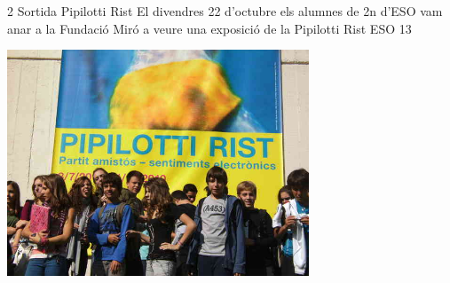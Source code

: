 %
%
\begin{news}
{2} %
{Sortida Pipilotti Rist}
{El divendres 22 d'octubre els alumnes de 2n d'ESO vam anar a la Fundació Miró a veure una exposició de la Pipilotti Rist}
{ESO}
{13} %

\noindent\includegraphics[width=9cm,keepaspectratio]{eso/img/gen/pipiloti_dpi_lowres.JPG}






\end{news}
